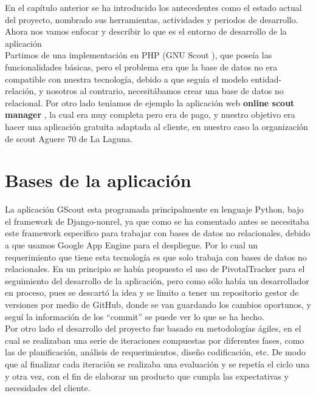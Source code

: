 

En el capítulo anterior se ha introducido los antecedentes como el estado actual del proyecto, 
nombrado sus herramientas, actividades y periodos de desarrollo. Ahora nos vamos enfocar y describir lo que es el
entorno de desarrollo de la aplicación\\

Partimos de una implementación en PHP (GNU Scout \cite{URL:GNUscout}), que poseía las funcionalidades básicas, pero el problema era que la base de datos
no era compatible con nuestra tecnología, debido a que seguía el modelo entidad-relación, y nosotros al contrario, necesitábamos
crear una base de datos no relacional. Por otro lado teníamos de ejemplo la aplicación web \textbf{online scout manager} \cite{URL:OnlineScoutManager}, la cual era muy completa
pero era de pago, y nuestro objetivo era hacer una aplicación gratuita adaptada al cliente, en nuestro caso la organización de scout Aguere 70 de La Laguna.



\section{Bases de la aplicación}
\label{2:sec1}

La aplicación GScout esta programada principalmente en lenguaje Python, bajo el framework de Django-nonrel,  
ya que como se ha comentado antes se necesitaba este framework especifico para trabajar con bases de datos no relacionales,
debido a que usamos Google App Engine para el despliegue. Por lo cual un requerimiento que tiene esta tecnología es que solo trabaja con
bases de datos no relacionales. En un principio se había propuesto el uso de PivotalTracker para el seguimiento del desarrollo de la aplicación, 
pero como sólo había un desarrollador en proceso, pues se descartó la idea y se limito a tener un repositorio gestor de versiones por medio de
GitHub, donde se van guardando los cambios oportunos, y seguí la información de los ``commit'' se puede ver lo que se ha hecho.\\

Por otro lado el desarrollo del proyecto fue basado en metodologías ágiles, en el cual se realizaban una serie de iteraciones compuestas por diferentes fases, como 
las de planificación, análisis de requerimientos, diseño codificación, etc. De modo que al finalizar cada iteración se realizaba una evaluación y se repetía el ciclo una y otra vez,
con el fin de elaborar un producto que cumpla las expectativas y necesidades del cliente.\\


